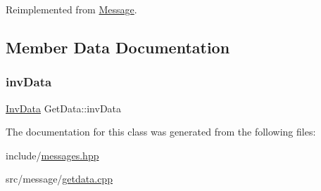 Reimplemented from \mbox{\hyperlink{classMessage_a6f8e3ac2eed3a8afe9400fcd5b3447b2}{Message}}.



\subsection{Member Data Documentation}
\mbox{\label{classGetData_a964b166c01dbec2325e35a62f65e504c}} 
\subsubsection{\texorpdfstring{inv\+Data}{invData}}
{\footnotesize\ttfamily \mbox{\hyperlink{structInvData}{Inv\+Data}} Get\+Data\+::inv\+Data\hspace{0.3cm}{\ttfamily [private]}}



The documentation for this class was generated from the following files\+:\begin{DoxyCompactItemize}
\item 
include/\mbox{\hyperlink{messages_8hpp}{messages.\+hpp}}\item 
src/message/\mbox{\hyperlink{getdata_8cpp}{getdata.\+cpp}}\end{DoxyCompactItemize}
